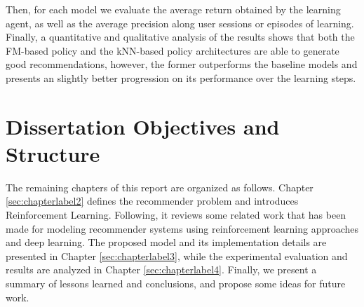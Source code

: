 Then, for each model we evaluate the average return obtained by the learning agent, as well as the average precision along user sessions or episodes of learning. Finally, a quantitative and qualitative analysis of the results shows that both the FM-based policy and the kNN-based policy architectures are able to generate good recommendations, however, the former outperforms the baseline models and presents an slightly better progression on its performance over the learning steps.

\section{Dissertation Objectives and Structure}

The remaining chapters of this report are organized as follows. Chapter \ref{sec:chapterlabel2} defines the recommender problem and introduces Reinforcement Learning. Following, it reviews some related work that has been made for modeling recommender systems using reinforcement learning approaches and deep learning. The proposed model and its implementation details are presented in Chapter \ref{sec:chapterlabel3}, while the experimental evaluation and results are analyzed in Chapter \ref{sec:chapterlabel4}. Finally, we present a summary of lessons learned and conclusions, and propose some ideas for future work.